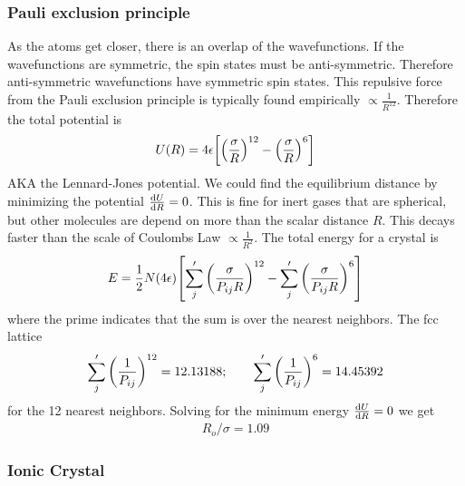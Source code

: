 \documentclass[../main.tex]{subfiles}
\begin{document}
\subsubsection*{Pauli exclusion principle}

As the atoms get closer, there is an overlap of the wavefunctions. If the wavefunctions are
symmetric, the spin states must be anti-symmetric. Therefore anti-symmetric wavefunctions have
symmetric spin states. This repulsive force from the Pauli exclusion principle is typically
found empirically $\propto \frac{1}{R^{12}}$. Therefore the total potential is
\begin{align*}
    U(R) = 4 \epsilon \qt[\qt(\frac{\sigma}{R})^{12} - \qt(\frac{\sigma}{R})^{6}]
\end{align*}
AKA the Lennard-Jones potential. We could find the equilibrium distance by minimizing the
potential $\dv{U}{R} = 0$. This is fine for inert gases that are spherical, but other molecules are
depend on more than the scalar distance $R$. This decays faster than the scale of Coulombs Law
$\propto \frac{1}{R^2}$. The total energy for a crystal is
\begin{align*}
    E = \frac{1}{2} N (4\epsilon) \qt[
        \sum_j ' \qt(\frac{\sigma}{P_{ij}R})^{12} - \sum_j ' \qt(\frac{\sigma}{P_{ij}R})^{6}
    ]
\end{align*}
where the prime indicates that the sum is over the nearest neighbors. The fcc lattice
\begin{align*}
    \sum_j' \qt(\frac{1}{P_{ij}})^{12} = 12.13188; \qquad \sum_j' \qt(\frac{1}{P_{ij}})^6 = 14.45392
\end{align*}
for the 12 nearest neighbors. Solving for the minimum energy $\dv{U}{R} = 0$ we get 
\begin{align*}
    R_o / \sigma = 1.09
\end{align*}

\subsubsection*{Ionic Crystal}
\end{document}
